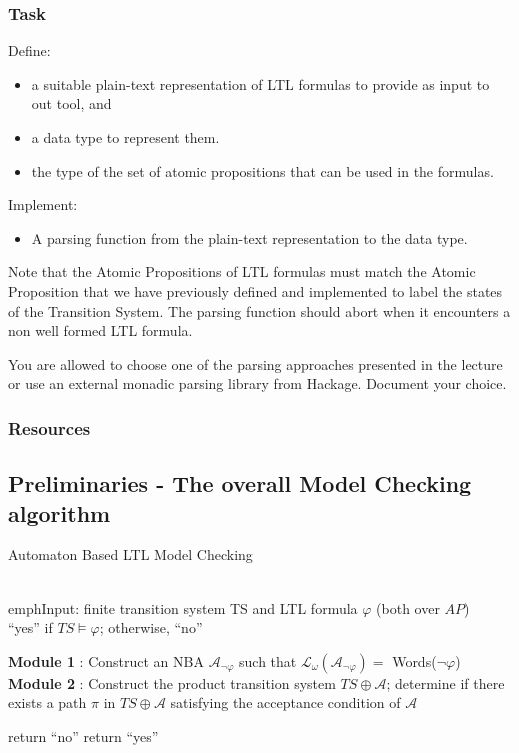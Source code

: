 \documentclass{article}
\begin{document}
\subsubsection*{Task}
Define:
\begin{itemize}
    \item a suitable plain-text representation of LTL formulas to provide as input to out tool, and
    \item a data type to represent them. 
    \item the type of the set of atomic propositions that can be used in the formulas.
\end{itemize}
Implement: 
\begin{itemize}
    \item A parsing function from the plain-text representation to the data type.
\end{itemize}
Note that the Atomic Propositions of LTL formulas must match the Atomic Proposition that we have previously 
defined and implemented to label the states of the Transition System. The parsing function should abort 
when it encounters a non well formed LTL formula.

You are allowed to choose one of the parsing approaches presented in the lecture or 
use an external monadic parsing library from Hackage. Document your choice.

\subsubsection*{Resources}
\cite[Paragraph 5.1(in particular 5.1.1 and 5.1.2)]{BaKa}

\subsection{Preliminaries - The overall Model Checking algorithm}
\begin{algorithm}[H]
    \caption{Automaton Based LTL Model Checking}
    \label{alg:mc}
    \hspace*{\algorithmicindent} \\emph{Input}: finite transition system TS and LTL formula $\varphi$ (both over $AP$) \\
    \hspace*{\algorithmicindent} ``yes'' if $TS \vDash \varphi$; otherwise, ``no''
    \begin{algorithmic}[1]
    \State \textbf{Module 1} : Construct an NBA $\mathcal{A}_{\neg \varphi}$ such that $\mathcal{L}_{\omega}(\mathcal{A}_{\neg \varphi}) = $ Words($\neg \varphi$) 
    \State \textbf{Module 2} : Construct the product transition system $TS \oplus \mathcal{A}$; determine if there exists 
                a path $\pi$ in $TS \oplus \mathcal{A}$ satisfying the acceptance condition of $\mathcal{A}$

        \State return ``no'' 
    \Else 
        \State return ``yes''
    \EndIf
    \end{algorithmic}
\end{algorithm}
  
\end{document}
